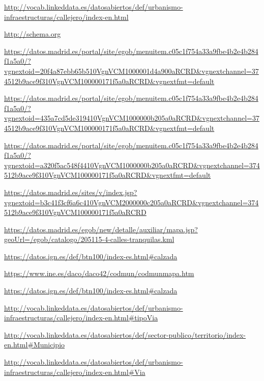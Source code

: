 \begin{thebibliography}{99}

\url{http://vocab.linkeddata.es/datosabiertos/def/urbanismo-infraestructuras/callejero/index-en.html}

\url{http://schema.org}

\url{https://datos.madrid.es/portal/site/egob/menuitem.c05c1f754a33a9fbe4b2e4b284f1a5a0/?vgnextoid=20f4a87ebb65b510VgnVCM1000001d4a900aRCRD&vgnextchannel=374512b9ace9f310VgnVCM100000171f5a0aRCRD&vgnextfmt=default}

\url{https://datos.madrid.es/portal/site/egob/menuitem.c05c1f754a33a9fbe4b2e4b284f1a5a0/?vgnextoid=435a7cd5de319410VgnVCM1000000b205a0aRCRD&vgnextchannel=374512b9ace9f310VgnVCM100000171f5a0aRCRD&vgnextfmt=default}

\url{https://datos.madrid.es/portal/site/egob/menuitem.c05c1f754a33a9fbe4b2e4b284f1a5a0/?vgnextoid=a320f5ac548f4410VgnVCM1000000b205a0aRCRD&vgnextchannel=374512b9ace9f310VgnVCM100000171f5a0aRCRD&vgnextfmt=default}


\url{https://datos.madrid.es/sites/v/index.jsp?vgnextoid=b3c41f3cf6a6c410VgnVCM2000000c205a0aRCRD&vgnextchannel=374512b9ace9f310VgnVCM100000171f5a0aRCRD}


\url{https://datos.madrid.es/egob/new/detalle/auxiliar/mapa.jsp?geoUrl=/egob/catalogo/205115-4-calles-tranquilas.kml}


\url{https://datos.ign.es/def/btn100/index-es.html#calzada}

\url{https://www.ine.es/daco/daco42/codmun/codmunmapa.htm}

\url{https://datos.ign.es/def/btn100/index-es.html#calzada}

\url{http://vocab.linkeddata.es/datosabiertos/def/urbanismo-infraestructuras/callejero/index-en.html#tipoVia}

\url{http://vocab.linkeddata.es/datosabiertos/def/sector-publico/territorio/index-en.html#Municipio}

\url{http://vocab.linkeddata.es/datosabiertos/def/urbanismo-infraestructuras/callejero/index-en.html#Via}


\end{thebibliography}
